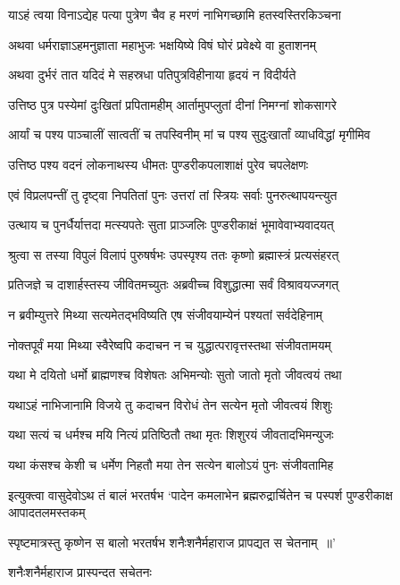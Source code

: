 \twolineshloka
{याऽहं त्वया विनाऽद्येह पत्या पुत्रेण चैव ह}
{मरणं नाभिगच्छामि हतस्वस्तिरकिञ्चना}


\twolineshloka
{अथवा धर्मराज्ञाऽहमनुज्ञाता महाभुजः}
{भक्षयिष्ये विषं घोरं प्रवेक्ष्ये वा हुताशनम्}


\twolineshloka
{अथवा दुर्भरं तात यदिदं मे सहस्रधा}
{पतिपुत्रविहीनाया हृदयं न विदीर्यते}


\twolineshloka
{उत्तिष्ठ पुत्र पस्येमां दुःखितां प्रपितामहीम्}
{आर्तामुपप्लुतां दीनां निमग्नां शोकसागरे}


\twolineshloka
{आर्यां च पश्य पाञ्चालीं सात्वतीं च तपस्विनीम्}
{मां च पश्य सुदुःखार्तां व्याधविद्धां मृगीमिव}


\twolineshloka
{उत्तिष्ठ पश्य वदनं लोकनाथस्य धीमतः}
{पुण्डरीकपलाशाक्षं पुरेव चपलेक्षणः}


\twolineshloka
{एवं विप्रलपन्तीं तु दृष्ट्वा निपतितां पुनः}
{उत्तरां तां स्त्रियः सर्वाः पुनरुत्थापयन्त्युत}


\twolineshloka
{उत्थाय च पुनर्धैर्यात्तदा मत्स्यपतेः सुता}
{प्राञ्जलिः पुण्डरीकाक्षं भूमावेवाभ्यवादयत्}


\twolineshloka
{श्रुत्वा स तस्या विपुलं विलापं पुरुषर्षभः}
{उपस्पृश्य ततः कृष्णो ब्रह्मास्त्रं प्रत्यसंहरत्}


\twolineshloka
{प्रतिजज्ञे च दाशार्हस्तस्य जीवितमच्युतः}
{अब्रवीच्च विशुद्धात्मा सर्वं विश्रावयज्जगत्}


\twolineshloka
{न ब्रवीम्युत्तरे मिथ्या सत्यमेतद्भविष्यति}
{एष संजीवयाम्येनं पश्यतां सर्वदेहिनाम्}


\twolineshloka
{नोक्तपूर्वं मया मिथ्या स्वैरेष्वपि कदाचन}
{न च युद्धात्परावृत्तस्तथा संजीवतामयम्}


\twolineshloka
{यथा मे दयितो धर्मो ब्राह्मणश्च विशेषतः}
{अभिमन्योः सुतो जातो मृतो जीवत्वयं तथा}


\twolineshloka
{यथाऽहं नाभिजानामि विजये तु कदाचन}
{विरोधं तेन सत्येन मृतो जीवत्वयं शिशुः}


\twolineshloka
{यथा सत्यं च धर्मश्च मयि नित्यं प्रतिष्ठितौ}
{तथा मृतः शिशुरयं जीवतादभिमन्युजः}


\twolineshloka
{यथा कंसश्च केशी च धर्मेण निहतौ मया}
{तेन सत्येन बालोऽयं पुनः संजीवतामिह}


\threelineshloka
{इत्युक्त्वा वासुदेवोऽथ तं बालं भरतर्षभ}
{`पादेन कमलाभेन ब्रह्मरुद्रार्चितेन च}
{पस्पर्श पुण्डरीकाक्ष आपादतलमस्तकम्}


\twolineshloka
{स्पृष्टमात्रस्तु कृष्णेन स बालो भरतर्षभ}
{शनैःशनैर्महाराज प्रापद्यत स चेतनाम् ॥'}


शनैःशनैर्महाराज प्रास्पन्दत सचेतनः

